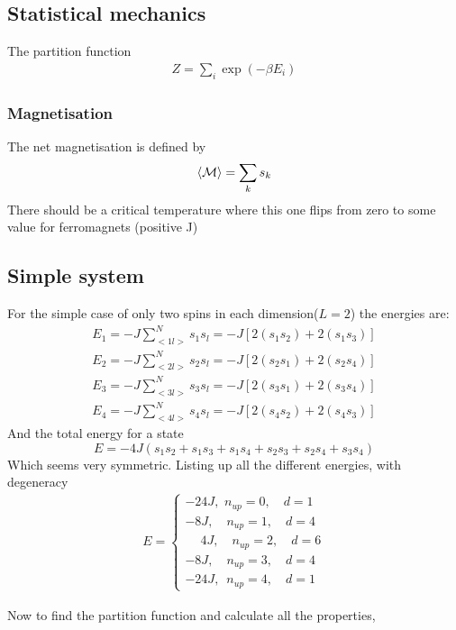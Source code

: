 \documentclass[11pt,a4paper,english]{article}
\numberwithin{equation}{section}
\newcommand{\magM}{\mathcal{M}}
\begin{document}
\subsection{Statistical mechanics}
The partition function
\begin{gather}
Z = \sum_i \exp(-\beta E_i)
\end{gather}

\subsubsection{Magnetisation}

The net magnetisation is defined by
\begin{gather}
\expval{\magM} = \sum_k s_k
\end{gather}
There should be a critical temperature where this one flips from 
zero to some value for ferromagnets (positive J)


\subsection{Simple system}
For the simple case of only two spins in each dimension($L=2$) the energies are:
\begin{align*}
E_1 = -J\sum_{<1l>}^{N}s_1 s_l = -J[2(s_1 s_2)+2(s_1 s_3)] \\
E_2 = -J\sum_{<2l>}^{N}s_2 s_l = -J[2(s_2 s_1)+2(s_2 s_4)] \\
E_3 = -J\sum_{<3l>}^{N}s_3 s_l = -J[2(s_3 s_1)+2(s_3 s_4)] \\
E_4 = -J\sum_{<4l>}^{N}s_4 s_l = -J[2(s_4 s_2)+2(s_4 s_3)] 
\end{align*}
And the total energy for a state 
\begin{equation}
E = -4J(s_1s_2 + s_1s_3 + s_1s_4 + s_2s_3 + s_2s_4 + s_3s_4)
\end{equation}
Which seems very symmetric. Listing up all the different energies,
with degeneracy
\begin{gather*}
 E = 
\begin{cases}
-24J,\,\,n_{up} = 0,\quad d = 1\\
-8J,\quad n_{up} = 1,\quad d = 4\\
\phantom{-}4J, \quad n_{up} = 2, \quad d = 6\\
-8J,\quad n_{up} = 3, \quad d= 4\\
-24J,\,\,\,n_{up} = 4, \quad d = 1
\end{cases}
\end{gather*}

Now to find the partition function and calculate all the properties,
\end{document}
